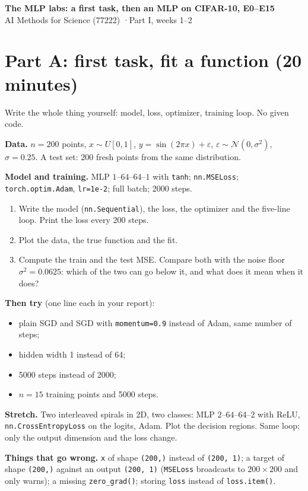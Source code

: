 \documentclass[11pt]{article}
\newcommand{\code}[1]{\texttt{#1}}
\begin{document}
\sloppy
\begin{center}
{\Large\bfseries The MLP labs: a first task, then an MLP on CIFAR-10, E0--E15}\\[3pt]
AI Methods for Science (77222) \quad·\quad Part I, weeks 1--2
\end{center}

\section*{Part A: first task, fit a function (20 minutes)}
Write the whole thing yourself: model, loss, optimizer, training loop. No given code.

\textbf{Data.} $n=200$ points, $x\sim U[0,1]$, $y=\sin(2\pi x)+\varepsilon$, $\varepsilon\sim\mathcal N(0,\sigma^2)$, $\sigma=0.25$. A test set: 200 fresh points from the same distribution.

\textbf{Model and training.} MLP $1$--$64$--$64$--$1$ with \code{tanh}; \code{nn.MSELoss}; \code{torch.optim.Adam}, \code{lr=1e-2}; full batch; 2000 steps.
\begin{enumerate}
  \item Write the model (\code{nn.Sequential}), the loss, the optimizer and the five-line loop. Print the loss every 200 steps.
  \item Plot the data, the true function and the fit.
  \item Compute the train and the test MSE. Compare both with the noise floor $\sigma^2=0.0625$: which of the two can go below it, and what does it mean when it does?
\end{enumerate}
\textbf{Then try} (one line each in your report):
\begin{itemize}
  \item plain SGD and SGD with \code{momentum=0.9} instead of Adam, same number of steps;
  \item hidden width 1 instead of 64;
  \item 5000 steps instead of 2000;
  \item $n=15$ training points and 5000 steps.
\end{itemize}
\textbf{Stretch.} Two interleaved spirals in 2D, two classes: MLP $2$--$64$--$64$--$2$ with ReLU, \code{nn.CrossEntropyLoss} on the logits, Adam. Plot the decision regions. Same loop; only the output dimension and the loss change.

\textbf{Things that go wrong.} \code{x} of shape \code{(200,)} instead of \code{(200, 1)}; a target of shape \code{(200,)} against an output \code{(200, 1)} (\code{MSELoss} broadcasts to $200\times200$ and only warns); a missing \code{zero\_grad()}; storing \code{loss} instead of \code{loss.item()}.
\end{document}
